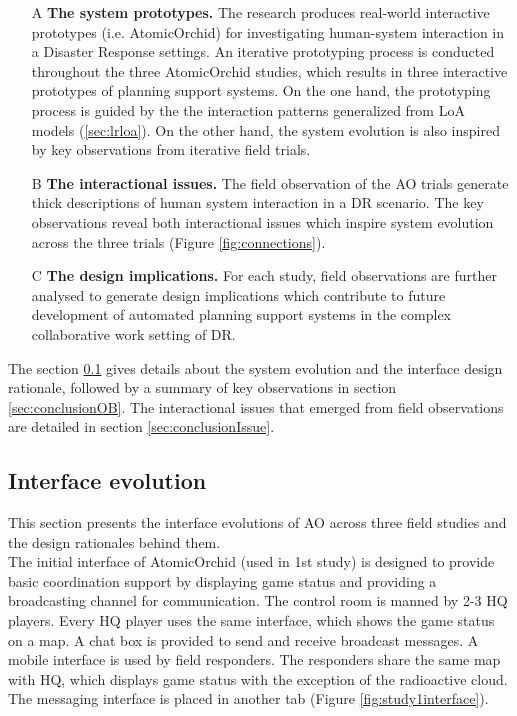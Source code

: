 \begin{enumerate}
  \item[A] \textbf{The system prototypes.} The research produces real-world interactive prototypes (i.e. AtomicOrchid) for investigating human-system interaction in a Disaster Response settings. An iterative prototyping process is conducted throughout the three AtomicOrchid studies, which results in three interactive prototypes of planning support systems. On the one hand, the prototyping process is guided by the the interaction patterns generalized from \ac{LoA} models (\ref{sec:lrloa}). On the other hand, the system evolution is also inspired by key observations from iterative field trials. 
  
  \item[B] \textbf{The interactional issues.} The field observation of the \ac{AO} trials generate thick descriptions of human system interaction in a \ac{DR} scenario. The key observations reveal both interactional issues which inspire system evolution across the three trials (Figure \ref{fig:connections}).
  
  \item[C] \textbf{The design implications.} For each study, field observations are further analysed to generate design implications which contribute to future development of automated planning support systems in the complex collaborative work setting of \ac{DR}. 
\end{enumerate}

The section \ref{sec:conclusionIE} gives details about the system evolution and the interface design rationale, followed by a summary of key observations in section \ref{sec:conclusionOB}. The interactional issues that emerged from field observations are detailed in section \ref{sec:conclusionIssue}. \\



\subsection{Interface evolution}\label{sec:conclusionIE}
This section presents the interface evolutions of \acf{AO} across three field studies and the design rationales behind them.\\

The initial interface of AtomicOrchid (used in 1st study) is designed to provide basic coordination support by displaying game status and providing a broadcasting channel for communication. The control room is manned by 2-3 HQ players. Every HQ player uses the same interface, which shows the game status on a map. A chat box is provided to send and receive broadcast messages. A mobile interface is used by field responders. The responders share the same map with HQ, which displays game status with the exception of the radioactive cloud. The messaging interface is placed in another tab (Figure \ref{fig:study1interface}).\\ 

